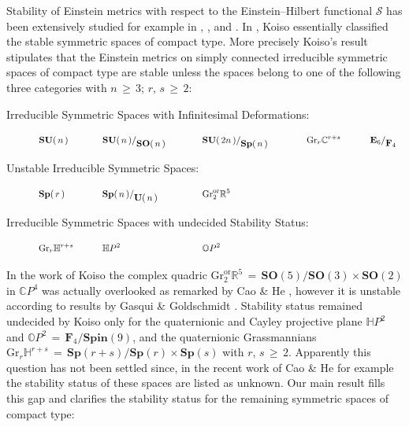 \documentclass[12pt]{article}
\def\C{\mathbb{C}}
\def\E{\mathbf{E}}
\def\EH{\mathcal{S}}
\def\F{\mathbf{F}}
\def\Gr{\mathrm{Gr}}
\def\H{\mathbb{H}}
\def\O{\mathbb{O}}
\def\R{\mathbb{R}}
\def\SO{\mathbf{SO}}
\def\Sp{\mathbf{Sp}}
\def\Spin{\mathbf{Spin}}
\def\SU{\mathbf{SU}}
\def\U{\mathbf{U}}
\begin{document}
 Stability of Einstein metrics with respect to the Einstein--Hilbert
 functional $\EH$ has been extensively studied for example in \cite{Koiso80},%
 \cite{Koiso82},\cite{DWW05} and \cite{K17}. In \cite{Koiso80},\cite{Koiso82}
 Koiso essentially classified the stable symmetric spaces of compact type.
 More precisely Koiso's result stipulates that the Einstein metrics on simply
 connected irreducible symmetric spaces of compact type are stable unless the
 spaces belong to one of the following three categories with
 $n\,\geq\,3;\,r,\,s\,\geq\,2$:
 \begin{description}
  \item[Irreducible Symmetric Spaces with Infinitesimal Deformations:]
   $$
    \hbox to70pt{$\displaystyle\SU(\,n\,)$\hfill}
    \hbox to110pt{$\displaystyle\SU(\,n\,)/_{\displaystyle\SO(\,n\,)}$\hfill}
    \hbox to115pt{$\displaystyle\SU(\,2n\,)/_{\displaystyle\Sp(\,n\,)}$\hfill}
    \hbox to70pt{$\displaystyle\Gr_r\C^{r+s}$\hfill}
    \hbox to70pt{$\displaystyle\E_6/_{\displaystyle\F_4}$\hfill}
   $$
  \item[Unstable Irreducible Symmetric Spaces:]
   $$
    \hbox to70pt{$\displaystyle\Sp(\,r\,)$\hfill}
    \hbox to110pt{$\displaystyle\Sp(\,n\,)/_{\displaystyle\U(\,n\,)}$\hfill}
    \hbox to115pt{$\displaystyle\Gr^{\mathrm{or}}_2\R^5$\hfill}
    \hbox to70pt{\hfill}\hbox to70pt{\hfill}
   $$
  \item[Irreducible Symmetric Spaces with undecided Stability Status:]
   $$
    \hbox to70pt{$\displaystyle\Gr_r\H^{r+s}$\hfill}
    \hbox to110pt{$\displaystyle\H P^2$\hfill}
    \hbox to115pt{$\displaystyle\O P^2$\hfill}
    \hbox to70pt{\hfill}\hbox to70pt{\hfill}
   $$
 \end{description}
 In the work of Koiso the complex quadric $\Gr^{\mathrm{or}}_2\R^5\,=\,
 \SO(5)/\SO(3)\times\SO(2)$ in $\C P^4$ was actually overlooked as remarked
 by Cao \& He \cite{CH15}, however it is unstable according to results by
 Gasqui \& Goldschmidt \cite{GG96}. Stability status remained undecided by
 Koiso only for the quaternionic and Cayley projective plane $\H P^2$ and
 $\O P^2\,=\,\F_4/\Spin(9)$, and the quaternionic Grassmannians
 $\Gr_r\H^{r+s}\,=\,\Sp(r+s)/\Sp(r)\times\Sp(s)$ with $r,\,s\,\geq\,2$.
 Apparently this question has not been settled since, in the recent work
 of Cao \& He \cite[Table 2]{CH15} for example the stability status of
 these spaces are listed as unknown. Our main result fills this gap
 and clarifies the stability status for the remaining symmetric spaces
 of compact type:
 
\end{document}
